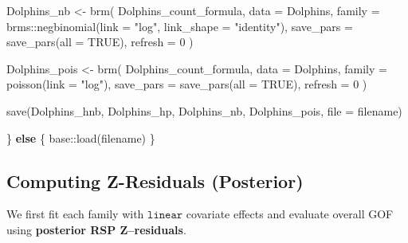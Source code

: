 \documentclass[
  english,
  letterpaper,
  DIV=11,
  numbers=noendperiod]{scrartcl}
\newenvironment{Shaded}{\begin{snugshade}}{\end{snugshade}}
\newcommand{\AttributeTok}[1]{\textcolor[rgb]{0.40,0.45,0.13}{#1}}
\newcommand{\ConstantTok}[1]{\textcolor[rgb]{0.56,0.35,0.01}{#1}}
\newcommand{\ControlFlowTok}[1]{\textcolor[rgb]{0.00,0.23,0.31}{\textbf{#1}}}
\newcommand{\DecValTok}[1]{\textcolor[rgb]{0.68,0.00,0.00}{#1}}
\newcommand{\FunctionTok}[1]{\textcolor[rgb]{0.28,0.35,0.67}{#1}}
\newcommand{\NormalTok}[1]{\textcolor[rgb]{0.00,0.23,0.31}{#1}}
\newcommand{\OtherTok}[1]{\textcolor[rgb]{0.00,0.23,0.31}{#1}}
\newcommand{\SpecialCharTok}[1]{\textcolor[rgb]{0.37,0.37,0.37}{#1}}
\newcommand{\StringTok}[1]{\textcolor[rgb]{0.13,0.47,0.30}{#1}}
\begin{document}
\begin{Shaded}
\begin{Highlighting}[]
\NormalTok{  Dolphins\_nb }\OtherTok{\textless{}{-}} \FunctionTok{brm}\NormalTok{(}
\NormalTok{    Dolphins\_count\_formula,}
    \AttributeTok{data   =}\NormalTok{ Dolphins,}
    \AttributeTok{family =}\NormalTok{ brms}\SpecialCharTok{::}\FunctionTok{negbinomial}\NormalTok{(}\AttributeTok{link =} \StringTok{"log"}\NormalTok{, }\AttributeTok{link\_shape =} \StringTok{"identity"}\NormalTok{),}
    \AttributeTok{save\_pars =} \FunctionTok{save\_pars}\NormalTok{(}\AttributeTok{all =} \ConstantTok{TRUE}\NormalTok{),}
    \AttributeTok{refresh   =} \DecValTok{0}
\NormalTok{  )}
  
\NormalTok{  Dolphins\_pois }\OtherTok{\textless{}{-}} \FunctionTok{brm}\NormalTok{(}
\NormalTok{    Dolphins\_count\_formula,}
    \AttributeTok{data   =}\NormalTok{ Dolphins,}
    \AttributeTok{family =} \FunctionTok{poisson}\NormalTok{(}\AttributeTok{link =} \StringTok{"log"}\NormalTok{),}
    \AttributeTok{save\_pars =} \FunctionTok{save\_pars}\NormalTok{(}\AttributeTok{all =} \ConstantTok{TRUE}\NormalTok{),}
    \AttributeTok{refresh   =} \DecValTok{0}
\NormalTok{  )}

  \FunctionTok{save}\NormalTok{(Dolphins\_hnb, Dolphins\_hp, Dolphins\_nb, Dolphins\_pois, }\AttributeTok{file =}\NormalTok{ filename)}

\NormalTok{\} }\ControlFlowTok{else}\NormalTok{ \{}
\NormalTok{  base}\SpecialCharTok{::}\FunctionTok{load}\NormalTok{(filename)}
\NormalTok{\}}
\end{Highlighting}
\end{Shaded}

\subsection{Computing Z-Residuals
(Posterior)}\label{computing-z-residuals-posterior}

We first fit each family with \(\texttt{linear}\) covariate effects and
evaluate overall GOF using \textbf{posterior RSP Z--residuals}.
\end{document}
